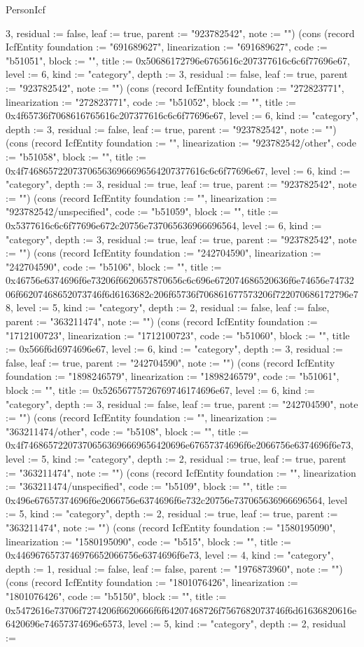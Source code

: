 \begin{lexlean}{PersonIcf}
\begin{semanticmodule}
{3, residual := false, leaf := true, parent := "923782542", note := ""}) (cons (record IcfEntity {foundation := "691689627", linearization := "691689627", code := "b51051", block := "", title := 0x50686172796e6765616c207377616c6c6f77696e67, level := 6, kind := "category", depth := 3, residual := false, leaf := true, parent := "923782542", note := ""}) (cons (record IcfEntity {foundation := "272823771", linearization := "272823771", code := "b51052", block := "", title := 0x4f65736f7068616765616c207377616c6c6f77696e67, level := 6, kind := "category", depth := 3, residual := false, leaf := true, parent := "923782542", note := ""}) (cons (record IcfEntity {foundation := "", linearization := "923782542/other", code := "b51058", block := "", title := 0x4f7468657220737065636966696564207377616c6c6f77696e67, level := 6, kind := "category", depth := 3, residual := true, leaf := true, parent := "923782542", note := ""}) (cons (record IcfEntity {foundation := "", linearization := "923782542/unspecified", code := "b51059", block := "", title := 0x5377616c6c6f77696e672c20756e737065636966696564, level := 6, kind := "category", depth := 3, residual := true, leaf := true, parent := "923782542", note := ""}) (cons (record IcfEntity {foundation := "242704590", linearization := "242704590", code := "b5106", block := "", title := 0x46756e6374696f6e73206f6620657870656c6c696e672074686520636f6e74656e7473206f66207468652073746f6d6163682c206f65736f706861677573206f722070686172796e78, level := 5, kind := "category", depth := 2, residual := false, leaf := false, parent := "363211474", note := ""}) (cons (record IcfEntity {foundation := "1712100723", linearization := "1712100723", code := "b51060", block := "", title := 0x566f6d6974696e67, level := 6, kind := "category", depth := 3, residual := false, leaf := true, parent := "242704590", note := ""}) (cons (record IcfEntity {foundation := "1898246579", linearization := "1898246579", code := "b51061", block := "", title := 0x52656775726769746174696e67, level := 6, kind := "category", depth := 3, residual := false, leaf := true, parent := "242704590", note := ""}) (cons (record IcfEntity {foundation := "", linearization := "363211474/other", code := "b5108", block := "", title := 0x4f746865722073706563696669656420696e67657374696f6e2066756e6374696f6e73, level := 5, kind := "category", depth := 2, residual := true, leaf := true, parent := "363211474", note := ""}) (cons (record IcfEntity {foundation := "", linearization := "363211474/unspecified", code := "b5109", block := "", title := 0x496e67657374696f6e2066756e6374696f6e732c20756e737065636966696564, level := 5, kind := "category", depth := 2, residual := true, leaf := true, parent := "363211474", note := ""}) (cons (record IcfEntity {foundation := "1580195090", linearization := "1580195090", code := "b515", block := "", title := 0x4469676573746976652066756e6374696f6e73, level := 4, kind := "category", depth := 1, residual := false, leaf := false, parent := "1976873960", note := ""}) (cons (record IcfEntity {foundation := "1801076426", linearization := "1801076426", code := "b5150", block := "", title := 0x5472616e73706f7274206f6620666f6f64207468726f7567682073746f6d61636820616e6420696e74657374696e6573, level := 5, kind := "category", depth := 2, residual := }
\end{semanticmodule}
\end{lexlean}
